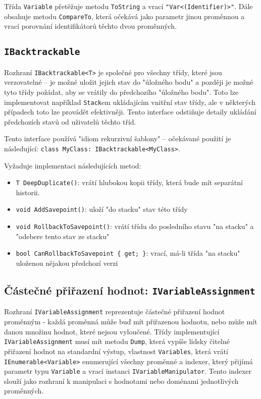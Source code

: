 \documentclass[a4paper]{article}
\begin{document}
Třída \texttt{Variable} přetěžuje metodu \texttt{ToString} a vrací
\texttt{"Var<(Identifier)>"}. Dále obsahuje metodu \texttt{CompareTo}, která
očekává jako parametr jinou proměnnou a vrací porovnání identifikátorů těchto
dvou proměnných.

\subsection{\texttt{IBacktrackable}}
Rozhraní \texttt{IBacktrackable<T>} je společné pro všechny třídy, které jsou
verzovatelné -- je možné uložit jejich stav do "úložného bodu" a později je
možné tyto třídy požádat, aby se vrátily do předchozího "úložného bodu".
Toto lze implementovat například \texttt{Stack}em ukládajícím vnitřní stav
třídy, ale v některých případech toto lze provádět efektivněji. Tento interface
odstiňuje detaily ukládání předchozích stavů od uživatelů těchto tříd.

Tento interface používá "idiom rekurzivní šablony" -- očekávané použití je
následující: \texttt{class MyClass: IBacktrackable<MyClass>}.

Vyžaduje implementaci následujících metod:
\begin{itemize}
\item \texttt{T DeepDuplicate()}: vrátí hlubokou kopii třídy, která bude mít
	separátní historii.
\item \texttt{void AddSavepoint()}: uloží "do stacku" stav této třídy
\item \texttt{void RollbackToSavepoint()}: vrátí třídu do posledního stavu "na
	stacku" a "odebere tento stav ze stacku"
\item \texttt{bool CanRollbackToSavepoint \{ get; \}}: vrací, má-li třída "na
	stacku" uloženou nějakou předchozí verzi
\end{itemize}

\subsection{Částečné přiřazení hodnot: \texttt{IVariableAssignment}}
Rozhraní \texttt{IVariableAssignment} reprezentuje částečné přiřazení hodnot
proměnným - každá proměnná může buď mít přiřazenou hodnotu, nebo může mít danou
množinu hodnot, které nejsou vyloučené. Třídy implementující
\texttt{IVariableAssignment} musí mít metodu \texttt{Dump}, která vypíše lidsky
čitelné přiřazení hodnot na standardní výstup, vlastnost \texttt{Variables},
která vrátí \texttt{IEnumerable<Variable>} enumerující všechny proměnné a
indexer, který přijímá parametr typu \texttt{Variable} a vrací instanci
\texttt{IVariableManipulator}. Tento indexer slouží jako rozhraní k manipulaci
s hodnotami nebo doménami jednotlivých proměnných.
\end{document}
